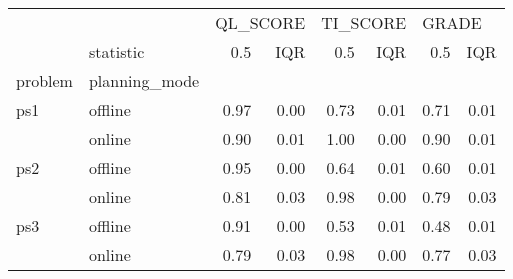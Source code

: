 \begin{tabular}{llrrrrrr}
\toprule
    & {} & \multicolumn{2}{l}{QL\_SCORE} & \multicolumn{2}{l}{TI\_SCORE} & \multicolumn{2}{l}{GRADE} \\
    & statistic &      0.5 &  IQR &      0.5 &  IQR &   0.5 &  IQR \\
problem & planning\_mode &          &      &          &      &       &      \\
\midrule
ps1 & offline &     0.97 & 0.00 &     0.73 & 0.01 &  0.71 & 0.01 \\
    & online &     0.90 & 0.01 &     1.00 & 0.00 &  0.90 & 0.01 \\
ps2 & offline &     0.95 & 0.00 &     0.64 & 0.01 &  0.60 & 0.01 \\
    & online &     0.81 & 0.03 &     0.98 & 0.00 &  0.79 & 0.03 \\
ps3 & offline &     0.91 & 0.00 &     0.53 & 0.01 &  0.48 & 0.01 \\
    & online &     0.79 & 0.03 &     0.98 & 0.00 &  0.77 & 0.03 \\
\bottomrule
\end{tabular}
